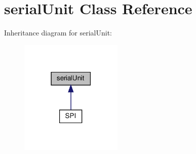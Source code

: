 \hypertarget{classserialUnit}{}\section{serial\+Unit Class Reference}
\label{classserialUnit}


Inheritance diagram for serial\+Unit\+:\nopagebreak
\begin{figure}[H]
\begin{center}
\leavevmode
\includegraphics[width=138pt]{classserialUnit__inherit__graph}
\end{center}
\end{figure}
